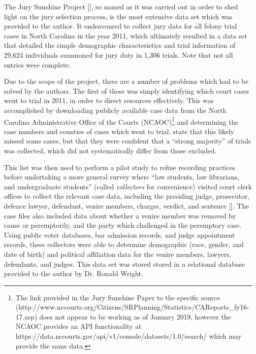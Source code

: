 The Jury Sunshine Project [\cite{JurySunshineProj}], so named as it was carried out in order to shed light on the jury
selection process, is the most extensive data set which was provided to the author. It endeavoured to collect jury data for all
felony trial cases in North Carolina in the year 2011, which ultimately resulted in a data set that detailed the simple
demographic characteristics and trial information of 29,624 individuals summoned for jury duty in 1,306 trials. Note that not all
entries were complete.

Due to the scope of the project, there are a number of problems which had to be solved by the authors. The first of these was
simply identifying which court cases went to trial in 2011, in order to direct resources effectively. This was accomplished by
downloading publicly available case data from the North Carolina Administrative Office of the Courts (NCAOC)\footnote{The link provided in
  the Jury Sunshine Paper to the specific source (http://www.nccourts.org/Citizens/SRPlanning/Statistics/CAReports\_fy16-17.asp)
  does not appear to be working as of January 2019, however the NCAOC provides an API functionality at
  https://data.nccourts.gov/api/v1/console/datasets/1.0/search/ which
  may provide the same data.} and determining the case numbers and counties of cases which went
to trial. \citeauthor{JurySunshineProj} state that this likely missed some cases, but that they were
confident that a ``strong majority'' of trials was collected, which did not systematically differ from those excluded.

This list was then used to perform a pilot study to refine recording practices before undertaking a more general survey where
``law students, law librarians, and undergraduate students'' (called \textit{collectors} for convenience) visited court clerk
offices to collect the relevant case data, including the presiding judge, prosecutor, defence lawyer, defendant, venire members,
charges, verdict, and sentence [\cite{JurySunshineProj}]. The case files also included data about whether a venire member was removed by cause or
peremptorily, and the party which challenged in the peremptory case. Using public voter databases, bar admission records, and
judge appointment records, these collectors were able to determine demographic (race, gender, and date of birth) and political
affiliation data for the venire members, lawyers, defendants, and judges. This data set was stored stored in a relational database
provided to the author by Dr. Ronald Wright.

